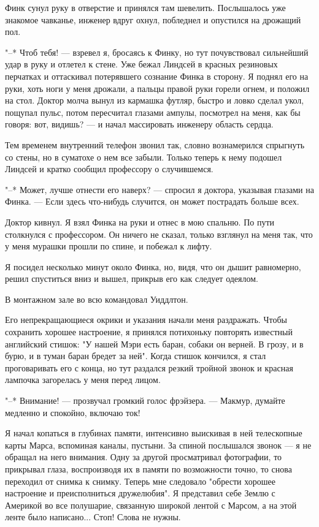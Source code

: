 Финк сунул руку в отверстие и принялся там  шевелить.  Послышалось  уже
знакомое чавканье, инженер вдруг охнул, побледнел и опустился на  дрожащий
пол.

"--* Чтоб тебя! ---  взревел  я,  бросаясь  к  Финку,  но  тут  почувствовал
сильнейший удар в руку и отлетел к стене.  Уже  бежал  Линдсей  в  красных
резиновых перчатках и оттаскивал потерявшего сознание Финка в  сторону.  Я
поднял его на руки, хоть ноги у меня дрожали, а пальцы правой руки  горели
огнем, и положил на стол. Доктор молча вынул из кармашка футляр, быстро  и
ловко  сделал  укол,  пощупал  пульс,  потом  пересчитал  глазами  ампулы,
посмотрел на меня, как бы говоря:  вот,  видишь?  ---  и  начал  массировать
инженеру область сердца.

Тем  временем  внутренний  телефон  звонил  так,  словно   вознамерился
спрыгнуть со стены, но в суматохе о нем все забыли. Только теперь  к  нему
подошел Линдсей и кратко сообщил профессору о случившемся.

"--* Может, лучше отнести  его  наверх?  ---  спросил  я  доктора,  указывая
глазами на Финка. --- Если здесь что-нибудь случится,  он  может  пострадать
больше всех.

Доктор кивнул. Я взял Финка на руки и отнес  в  мою  спальню.  По  пути
столкнулся с профессором. Он ничего не сказал,  только  взглянул  на  меня
так, что у меня мурашки прошли по спине, и побежал к лифту.

Я  посидел  несколько  минут  около  Финка,  но,  видя,  что  он  дышит
равномерно, решил  спуститься  вниз  и  вышел,  прикрыв  его  как  следует
одеялом.

В монтажном зале во всю командовал Уиддлтон.

Его непрекращающиеся окрики и указания начали  меня  раздражать.  Чтобы
сохранить хорошее настроение, я принялся  потихоньку  повторять  известный
английский стишок: "У нашей Мэри есть баран, собаки он верней. В грозу,  и
в бурю, и в туман баран бредет за ней".  Когда  стишок  кончился,  я  стал
проговаривать его с конца, но тут раздался резкий тройной звонок и красная
лампочка загорелась у меня перед лицом.

"--* Внимание! --- прозвучал  громкий  голос  фрэйзера.  ---  Макмур,  думайте
медленно и спокойно, включаю ток!

Я  начал  копаться  в  глубинах  памяти,  интенсивно  выискивая  в  ней
телескопные карты Марса, вспоминая каналы, пустыни. За  спиной  послышался
звонок --- я не обращал  на  него  внимания.  Одну  за  другой  просматривал
фотографии, то прикрывал глаза, воспроизводя их в  памяти  по  возможности
точно, то снова  переходил  от  снимка  к  снимку.  Теперь  мне  следовало
"обрести хорошее настроение и  преисполниться  дружелюбия".  Я  представил
себе Землю с Америкой во все полушарие, связанную широкой лентой с Марсом,
а на этой ленте было написано... Стоп! Слова не нужны.

